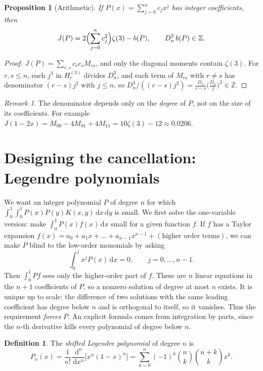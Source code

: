 \documentclass[11pt]{article}
\newcommand{\Z}{\mathbb{Z}}
\newcommand{\dd}{\,\mathrm{d}}
\newcommand{\Dn}{D_n}
\theoremstyle{plain}
\newtheorem{proposition}[theorem]{Proposition}
\theoremstyle{definition}
\newtheorem{definition}[theorem]{Definition}
\theoremstyle{remark}
\newtheorem{remark}[theorem]{Remark}
\begin{document}
\begin{proposition}[Arithmetic]\label{prop:arith}
If $P(x)=\sum_{j=0}^nc_jx^j$ has integer coefficients, then
\[
  J(P)=2\Bigl(\sum_{j=0}^nc_j^2\Bigr)\zeta(3)-b(P),\qquad \Dn^3\,b(P)\in\Z .
\]
\end{proposition}

\begin{proof}
$J(P)=\sum_{r,s}c_rc_sM_{rs}$, and only the diagonal moments contain $\zeta(3)$. For
$r,s\le n$, each $j^3$ in $H^{(3)}_r$ divides $\Dn^3$, and each term of $M_{rs}$ with $r\ne s$ has
denominator $(r-s)j^2$ with $j\le n$, so $\Dn^3/((r-s)j^2)=\frac{\Dn}{r-s}\bigl(\frac{\Dn}{j}\bigr)^2\in\Z$.
\end{proof}

\begin{remark}
The denominator depends only on the \emph{degree} of $P$, not on the size of its coefficients.
For example $J(1-2x)=M_{00}-4M_{01}+4M_{11}=10\zeta(3)-12\approx0.0206$.
\end{remark}

\section{Designing the cancellation: Legendre polynomials}\label{sec:legendre}

We want an integer polynomial $P$ of degree $n$ for which
$\int_0^1\!\int_0^1P(x)P(y)K(x,y)\dd x\dd y$ is small. We first solve the one-variable version:
make $\int_0^1P(x)f(x)\dd x$ small for a given function $f$. If $f$ has a Taylor expansion
$f(x)=a_0+a_1x+\dots+a_{n-1}x^{n-1}+(\text{higher order terms})$, we can make $P$ blind to the
low-order monomials by asking
\begin{equation}\label{eq:orth}
  \int_0^1x^jP(x)\dd x=0,\qquad j=0,\dots,n-1.
\end{equation}
Then $\int_0^1Pf$ sees only the higher-order part of $f$. These are $n$ linear equations in the
$n+1$ coefficients of $P$, so a nonzero solution of degree at most $n$ exists. It is unique up to
scale: the difference of two solutions with the same leading coefficient has degree below $n$ and
is orthogonal to itself, so it vanishes. Thus the requirement \emph{forces} $P$. An explicit
formula comes from integration by parts, since the $n$-th derivative kills every polynomial of
degree below $n$.

\begin{definition}
The \emph{shifted Legendre polynomial} of degree $n$ is
\[
  P_n(x)=\frac1{n!}\frac{\dd^n}{\dd x^n}\bigl[x^n(1-x)^n\bigr]
  =\sum_{k=0}^n(-1)^k\binom nk\binom{n+k}k x^k .
\]
\end{definition}
\end{document}
